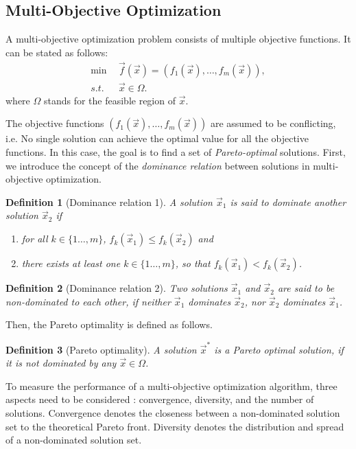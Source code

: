 \documentclass[10pt,journal,compsoc]{IEEEtran}
\newtheorem{definition}{Definition}
\begin{document}
\subsection{Multi-Objective Optimization}

A multi-objective optimization problem consists of multiple objective functions. It can be stated as follows:
\begin{align}
\min \ \ & \vec{f}(\vec{x}) = (f_1(\vec{x}), \dots, f_m(\vec{x})), \\
s.t. \ \ & \vec{x} \in \Omega.
\end{align}
where $\Omega$ stands for the feasible region of $\vec{x}$.

The objective functions $(f_1(\vec{x}), \dots, f_m(\vec{x}))$ are assumed to be conflicting, i.e. No single solution can achieve the optimal value for all the objective functions. In this case, the goal is to find a set of \emph{Pareto-optimal} solutions. First, we introduce the concept of the \emph{dominance relation} between solutions in multi-objective optimization.
\begin{definition}[Dominance relation 1]
	A solution $\vec{x}_1$ is said to \emph{dominate} another solution $\vec{x}_2$ if 
	\begin{enumerate}
		\item for all $k \in \{1 \dots, m\}$, $f_k(\vec{x}_1) \leq f_k(\vec{x}_2)$ and
		\item there exists at least one $k \in \{1 \dots, m\}$, so that $f_k(\vec{x}_1) < f_k(\vec{x}_2)$.
	\end{enumerate}
\end{definition}
\begin{definition}[Dominance relation 2]
	Two solutions $\vec{x}_1$ and $\vec{x}_2$ are said to be \emph{non-dominated} to each other, if \emph{neither $\vec{x}_1$ dominates $\vec{x}_2$, nor $\vec{x}_2$ dominates $\vec{x}_1$}.
\end{definition}
Then, the Pareto optimality is defined as follows.
\begin{definition}[Pareto optimality]
	A solution $\vec{x}^*$ is a \emph{Pareto optimal solution}, if it is not dominated by any $\vec{x} \in \Omega$.
\end{definition}


To measure the performance of a multi-objective optimization algorithm, three aspects need to be considered \cite{Okabe:je,7360024}: convergence, diversity, and the number of solutions.
Convergence denotes the closeness between a non-dominated solution set to the theoretical Pareto front. Diversity denotes the distribution and spread of a non-dominated solution set.
\end{document}
